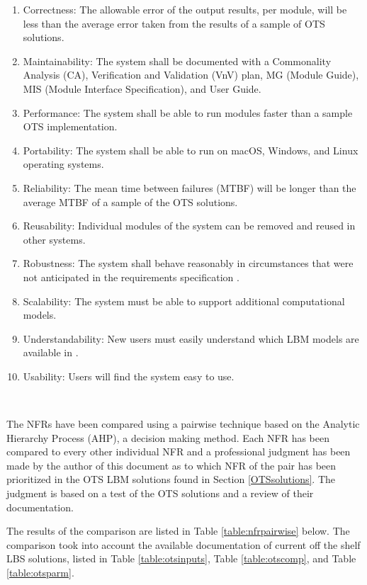 \documentclass[12pt]{article}
\begin{document}
\begin{enumerate}
\item Correctness: The allowable error of the output results, per module, will be less than the average error taken from the results of a sample of OTS solutions.
\item Maintainability: The system shall be documented with a Commonality Analysis (CA), Verification and Validation (VnV) plan, MG (Module Guide), MIS (Module Interface Specification), and User Guide.
\item Performance: The system shall be able to run modules faster than a sample OTS implementation.
\item Portability: The system shall be able to run on macOS, Windows, and Linux operating systems.
\item Reliability: The mean time between failures (MTBF) will be longer than the average MTBF of a sample of the OTS solutions.
\item Reusability: Individual modules of the system can be removed and reused in other systems.
\item Robustness: The system shall behave reasonably in circumstances that were not anticipated in the requirements specification \cite{ghezzi1991fundamentals}.
\item Scalability: The system must be able to support additional computational models.
\item Understandability: New users must easily understand which LBM models are available in {\progname}.
\item Usability: Users will find the system easy to use.
\end{enumerate}

~\newpage

The NFRs have been compared using a pairwise technique based on the Analytic Hierarchy Process (AHP), a decision making method. Each NFR has been compared to every other individual NFR and a professional judgment has been made by the author of this document as to which NFR of the pair has been prioritized in the OTS LBM solutions found in Section \ref{OTSsolutions}. The judgment is based on a test of the OTS solutions and a review of their documentation.

The results of the comparison are listed in Table \ref{table:nfrpairwise} below. The comparison took into account the available documentation of current off the shelf LBS solutions, listed in Table \ref{table:otsinputs}, Table \ref{table:otscomp}, and Table \ref{table:otsparm}.
\\
\end{document}
